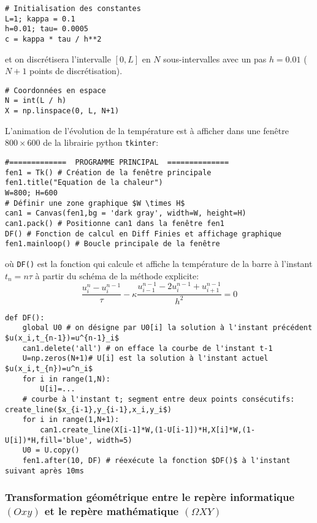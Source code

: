 \documentclass{article}
\begin{document}
\begin{verbatim}
# Initialisation des constantes
L=1; kappa = 0.1
h=0.01; tau= 0.0005
c = kappa * tau / h**2
\end{verbatim} 
 et on discrétisera l'intervalle $[0,L]$ en $N$ sous-intervalles avec un pas $h=0.01$ ($N+1$ points de discrétisation). 
 \begin{verbatim}
# Coordonnées en espace
N = int(L / h)
X = np.linspace(0, L, N+1)
\end{verbatim} 
 L'animation de l'évolution de la température est à afficher dans une fenêtre $800\times 600$  de la librairie python {\tt tkinter}:
\begin{verbatim}
#=============  PROGRAMME PRINCIPAL  ==============
fen1 = Tk() # Création de la fenêtre principale
fen1.title("Equation de la chaleur")
W=800; H=600
# Définir une zone graphique $W \times H$
can1 = Canvas(fen1,bg = 'dark gray', width=W, height=H)
can1.pack() # Positionne can1 dans la fenêtre fen1
DF() # Fonction de calcul en Diff Finies et affichage graphique
fen1.mainloop() # Boucle principale de la fenêtre
\end{verbatim} 
où {\tt DF()} est la fonction qui calcule et affiche la température de la barre à l'instant $t_n=n\tau$ à partir du schéma de la méthode explicite:
\[\frac{u^n_i-u^{n-1}_i}{\tau}-\kappa \frac{u^{n-1}_{i-1}-2u^{n-1}_i+u^{n-1}_{i+1}}{h^2}=0\]
\begin{verbatim}
def DF():
    global U0 # on désigne par U0[i] la solution à l'instant précédent  $u(x_i,t_{n-1})=u^{n-1}_i$
    can1.delete('all') # on efface la courbe de l'instant t-1
    U=np.zeros(N+1)# U[i] est la solution à l'instant actuel  $u(x_i,t_{n})=u^n_i$
    for i in range(1,N):
        U[i]=...
    # courbe à l'instant t; segment entre deux points consécutifs: create_line($x_{i-1},y_{i-1},x_i,y_i$)
    for i in range(1,N+1):
        can1.create_line(X[i-1]*W,(1-U[i-1])*H,X[i]*W,(1-U[i])*H,fill='blue', width=5)
    U0 = U.copy()
    fen1.after(10, DF) # réexécute la fonction $DF()$ à l'instant suivant après 10ms
\end{verbatim}     
\subsubsection*{Transformation géométrique entre le repère informatique $(Oxy)$ et le repère mathématique $(\Omega X Y)$  }
\end{document}
